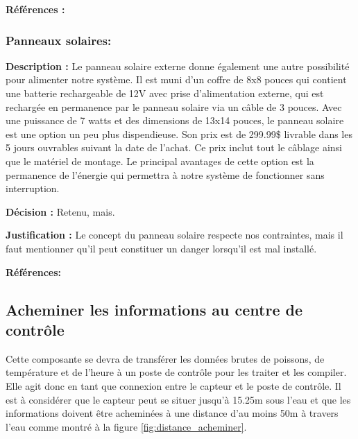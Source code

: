  \textbf{Références :} \cite{fil}
 
\subsubsection{Panneaux solaires:}

\textbf{Description :}
Le panneau solaire externe donne également une autre possibilité pour alimenter notre système. Il est muni d'un coffre de 8x8 pouces qui contient une batterie rechargeable de 12V avec prise d'alimentation externe, qui est rechargée en permanence par le panneau solaire via un câble de 3 pouces. Avec une puissance de 7 watts et des dimensions de 13x14 pouces, le panneau solaire est une option un peu plus dispendieuse. Son prix est de 299.99\$ livrable dans les 5 jours ouvrables suivant la date de l'achat. Ce prix inclut tout le câblage ainsi que le matériel de montage. Le principal avantages de cette option est la permanence de l'énergie qui permettra à notre système de fonctionner sans interruption.

\textbf{Décision :}
Retenu, mais.

\textbf{Justification :}
Le concept du panneau solaire respecte nos contraintes, mais il faut mentionner qu'il peut constituer un danger lorsqu'il est mal installé.


\textbf{Références:} \cite{Panneau_solaire}

\begin{table}[!htb]
\footnotesize
\centering
{}
\caption{Faisabilité des concepts pour l'alimentation du système}
\label{t:Decision_alimenter}
\end{table}

\subsection{Acheminer les informations au centre de contrôle}
Cette composante se devra de transférer les données brutes de poissons, de température et de l'heure à un poste de contrôle pour les traiter et les compiler. Elle agit donc en tant que connexion entre le capteur et le poste de contrôle. Il est à considérer que le capteur peut se situer jusqu'à 15.25m sous l'eau et que les informations doivent être acheminées à une distance d'au moins 50m à travers l'eau comme montré à la figure \ref{fig:distance_acheminer}.

